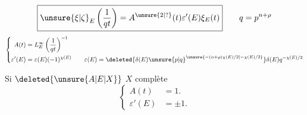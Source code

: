 \[
 \boxed{\unsure{\xi|\zeta}_E\left(\frac{1}{qt}\right)
 =A^{\unsure{2|?}}(t)\varepsilon'(E)\xi_E(t)}
 \qquad q=p^{n+\rho}
\]
\[
 \left\{\begin{aligned}
 A(t)&=L_E^\infty\left(\frac{1}{qt}\right)^{-1}\\
 \varepsilon'(E)&=\varepsilon(E)(-1)^{\chi(E)}
 \qquad \varepsilon(E)=
 \deleted{\delta(E)\unsure{p|q}^{\unsure{-(n+\rho)\chi(E)/2|-\chi(E)/2}}}
 \delta(E)q^{-\chi(E)/2}
 \end{aligned}\right.
\]

Si $\deleted{\unsure{A|E|X}}$ $X$ complète
\[
 \left\{\begin{aligned}
 A(t)&=1.\\
 \varepsilon'(E)&=\pm1.
 \end{aligned}\right.
\]

